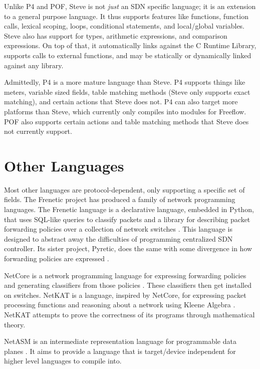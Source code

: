 Unlike P4 and POF, Steve is not \textit{just} an SDN specific language; it is an
extension to a general purpose language. It thus supports features like
functions, function calls, lexical scoping, loops, conditional statements, and
local/global variables. Steve also has support for types, arithmetic
expressions, and comparison expressions. On top of that, it automatically links
against the C Runtime Library, supports calls to external functions, and may be
statically or dynamically linked against any library.

Admittedly, P4 is a more mature language than Steve. P4 supports things like
meters, variable sized fields, table matching methods (Steve only supports exact
matching), and certain actions that Steve does not. P4 can also target more
platforms than Steve, which currently only compiles into modules for Freeflow.
POF also supports certain actions and table matching methods that Steve does not
currently support.

\section{Other Languages} \label{rel:frenetic}

Most other languages are protocol-dependent, only supporting a specific set of
fields. The Frenetic project has produced a family of network programming
languages. The Frenetic language is a declarative language, embedded in Python,
that uses SQL-like queries to classify packets and a library for describing
packet forwarding policies over a collection of network switches
\cite{foster2011frenetic, foster2013frenetic}. This language is designed to
abstract away the difficulties of programming centralized SDN controller. Its
sister project, Pyretic, does the same with some divergence in how forwarding
policies are expressed \cite{modularpyretic}. 

NetCore is a network programming language for expressing forwarding policies and
generating classifiers from those policies \cite{monsanto2012netcore}. These
classifiers then get installed on switches. NetKAT is a language, inspired by
NetCore, for expressing packet processing functions and reasoning about a
network using Kleene Algebra \cite{kozen2014netkat, anderson2014netkat}. NetKAT
attempts to prove the correctness of its programs through mathematical theory.

NetASM is an intermediate representation language for programmable data planes
\cite{shahbaz2015netasm}. It aims to provide a language that is target/device
independent for higher level languages to compile into.
